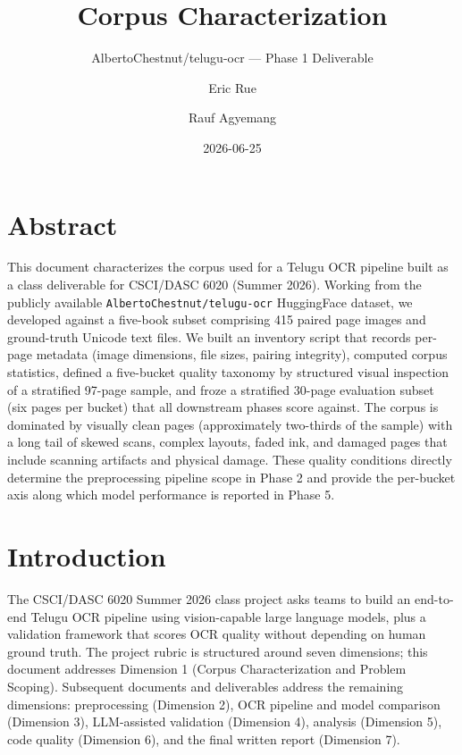 \documentclass[
  letterpaper,
  DIV=11,
  numbers=noendperiod]{scrartcl}
\title{Corpus Characterization}
\subtitle{AlbertoChestnut/telugu-ocr --- Phase 1 Deliverable}
\author{Eric Rue \and Rauf Agyemang}
\date{2026-06-25}
\renewcommand*\contentsname{Table of contents}
\newcommand\contentsname{Table of contents}
\begin{document}
\maketitle

\renewcommand*\contentsname{Table of contents}
{
\setcounter{tocdepth}{3}
\tableofcontents
}

\providecommand{\teluguchars}[1]{#1}

\section{Abstract}\label{abstract}

This document characterizes the corpus used for a Telugu OCR pipeline
built as a class deliverable for CSCI/DASC 6020 (Summer 2026). Working
from the publicly available \texttt{AlbertoChestnut/telugu-ocr}
HuggingFace dataset, we developed against a five-book subset comprising
415 paired page images and ground-truth Unicode text files. We built an
inventory script that records per-page metadata (image dimensions, file
sizes, pairing integrity), computed corpus statistics, defined a
five-bucket quality taxonomy by structured visual inspection of a
stratified 97-page sample, and froze a stratified 30-page evaluation
subset (six pages per bucket) that all downstream phases score against.
The corpus is dominated by visually clean pages (approximately
two-thirds of the sample) with a long tail of skewed scans, complex
layouts, faded ink, and damaged pages that include scanning artifacts
and physical damage. These quality conditions directly determine the
preprocessing pipeline scope in Phase 2 and provide the per-bucket axis
along which model performance is reported in Phase 5.

\section{Introduction}\label{introduction}

The CSCI/DASC 6020 Summer 2026 class project asks teams to build an
end-to-end Telugu OCR pipeline using vision-capable large language
models, plus a validation framework that scores OCR quality without
depending on human ground truth. The project rubric is structured around
seven dimensions; this document addresses Dimension 1 (Corpus
Characterization and Problem Scoping). Subsequent documents and
deliverables address the remaining dimensions: preprocessing (Dimension
2), OCR pipeline and model comparison (Dimension 3), LLM-assisted
validation (Dimension 4), analysis (Dimension 5), code quality
(Dimension 6), and the final written report (Dimension 7).
\end{document}
